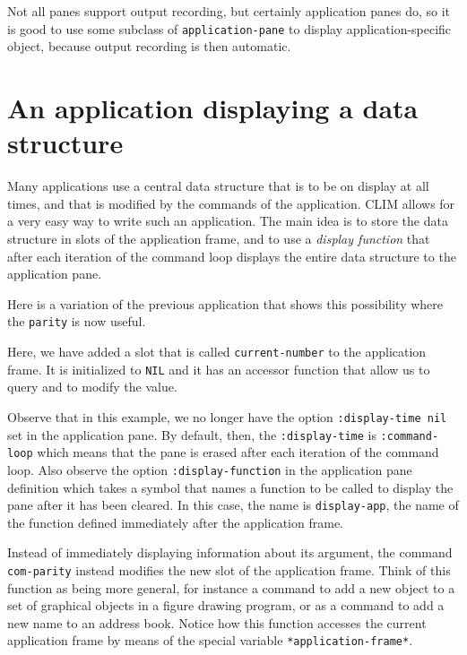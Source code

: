 Not all panes support output recording, but certainly application
panes do, so it is good to use some subclass of
\texttt{application-pane} to display application-specific object,
because output recording is then automatic.

\section{An application displaying a data structure}

Many applications use a central data structure that is to be on
display at all times, and that is modified by the commands of the
application.  CLIM allows for a very easy way to write such an
application.  The main idea is to store the data structure in slots of
the application frame, and to use a \emph{display function} that after
each iteration of the command loop displays the entire data structure
to the application pane.

Here is a variation of the previous application that shows this
possibility where the \texttt{parity} is now useful.



Here, we have added a slot that is called \texttt{current-number} to
the application frame.  It is initialized to \texttt{NIL} and it has
an accessor function that allow us to query and to modify the value.

Observe that in this example, we no longer have the option
\texttt{:display-time nil} set in the application pane.  By default,
then, the \texttt{:display-time} is \texttt{:command-loop} which means
that the pane is erased after each iteration of the command loop.
Also observe the option \texttt{:display-function} in the application
pane definition which takes a symbol that names a function to be
called to display the pane after it has been cleared.  In this case,
the name is \texttt{display-app}, the name of the function defined
immediately after the application frame.

Instead of immediately displaying information about its argument, the
command \texttt{com-parity} instead modifies the new slot of the
application frame.  Think of this function as being more general, for
instance a command to add a new object to a set of graphical objects
in a figure drawing program, or as a command to add a new name to an
address book.  Notice how this function accesses the current
application frame by means of the special variable
\texttt{*application-frame*}.

